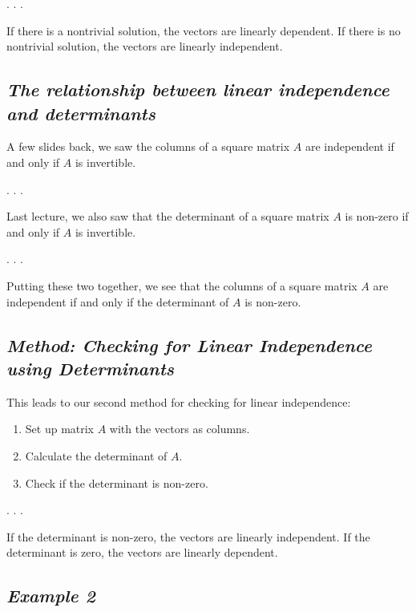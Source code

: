 \documentclass[
  letterpaper,
  DIV=11,
  numbers=noendperiod]{scrartcl}
\providecommand{\tightlist}{%
  \setlength{\itemsep}{0pt}\setlength{\parskip}{0pt}}\usepackage{longtable,booktabs,array}
\begin{document}
. . .

If there is a nontrivial solution, the vectors are linearly dependent.
If there is no nontrivial solution, the vectors are linearly
independent.

\subsection{\texorpdfstring{\emph{The relationship between linear
independence and
determinants}}{The relationship between linear independence and determinants}}\label{the-relationship-between-linear-independence-and-determinants}

A few slides back, we saw the columns of a square matrix \(A\) are
independent if and only if \(A\) is invertible.

. . .

Last lecture, we also saw that the determinant of a square matrix \(A\)
is non-zero if and only if \(A\) is invertible.

. . .

Putting these two together, we see that the columns of a square matrix
\(A\) are independent if and only if the determinant of \(A\) is
non-zero.

\subsection{\texorpdfstring{\emph{Method: Checking for Linear
Independence using
Determinants}}{Method: Checking for Linear Independence using Determinants}}\label{method-checking-for-linear-independence-using-determinants}

This leads to our second method for checking for linear independence:

\begin{enumerate}
\def\labelenumi{\arabic{enumi}.}
\tightlist
\item
  Set up matrix \(A\) with the vectors as columns.
\item
  Calculate the determinant of \(A\).
\item
  Check if the determinant is non-zero.
\end{enumerate}

. . .

If the determinant is non-zero, the vectors are linearly independent. If
the determinant is zero, the vectors are linearly dependent.

\subsection{\texorpdfstring{\emph{Example
2}}{Example 2}}\label{example-2}
\end{document}
